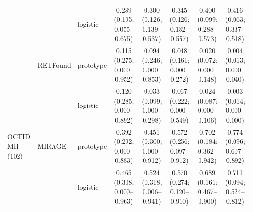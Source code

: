 \begin{tabular}{@{}lll*{5}{c}@{}}
 &  & logistic & \makecell{0.289\\{\scriptsize (0.195; 0.055--0.675)}} & \makecell{0.300\\{\scriptsize (0.126; 0.139--0.537)}} & \makecell{0.345\\{\scriptsize (0.126; 0.182--0.557)}} & \makecell{0.400\\{\scriptsize (0.099; 0.288--0.573)}} & \makecell{0.416\\{\scriptsize (0.063; 0.337--0.518)}} \\
 & RETFound & prototype & \makecell{0.115\\{\scriptsize (0.275; 0.000--0.952)}} & \makecell{0.094\\{\scriptsize (0.246; 0.000--0.853)}} & \makecell{0.048\\{\scriptsize (0.161; 0.000--0.272)}} & \makecell{0.020\\{\scriptsize (0.072; 0.000--0.148)}} & \makecell{0.004\\{\scriptsize (0.013; 0.000--0.040)}} \\
 &  & logistic & \makecell{0.120\\{\scriptsize (0.285; 0.000--0.892)}} & \makecell{0.033\\{\scriptsize (0.099; 0.000--0.298)}} & \makecell{0.067\\{\scriptsize (0.222; 0.000--0.549)}} & \makecell{0.024\\{\scriptsize (0.087; 0.000--0.106)}} & \makecell{0.003\\{\scriptsize (0.014; 0.000--0.000)}} \\
\addlinespace[2pt]
OCTID MH (102) & MIRAGE & prototype & \makecell{0.392\\{\scriptsize (0.292; 0.000--0.883)}} & \makecell{0.451\\{\scriptsize (0.300; 0.000--0.912)}} & \makecell{0.572\\{\scriptsize (0.256; 0.097--0.912)}} & \makecell{0.702\\{\scriptsize (0.184; 0.362--0.942)}} & \makecell{0.774\\{\scriptsize (0.096; 0.607--0.892)}} \\
 &  & logistic & \makecell{0.465\\{\scriptsize (0.308; 0.000--0.963)}} & \makecell{0.524\\{\scriptsize (0.318; 0.006--0.941)}} & \makecell{0.570\\{\scriptsize (0.274; 0.120--0.910)}} & \makecell{0.689\\{\scriptsize (0.161; 0.467--0.900)}} & \makecell{0.711\\{\scriptsize (0.094; 0.524--0.812)}} \\

\end{tabular}
